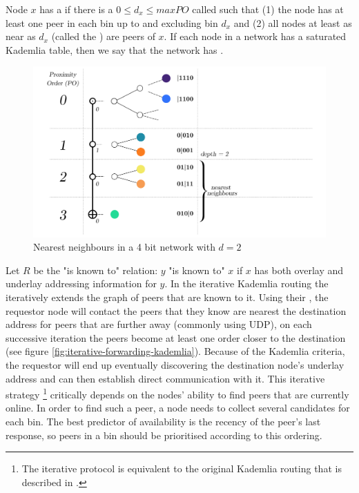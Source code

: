 \begin{figure}[htbp]
   \label{fig:kademlia-table}
\end{figure}

Node $x$ has a  if there is a $0\leq d_x\leq \mathit{maxPO}$ called  such that (1) the node has at least one peer in each bin up to and excluding  bin $d_x$ and (2) all nodes at least as near as $d_x$ (called the ) are peers of $x$. If each node in a network has a saturated Kademlia table, then we say that the network has .

\begin{figure}[htbp]
   \centering
    \includegraphics[width=\textwidth]{fig/kademlia-3.pdf}
   \caption[Nearest neighbours \statusgreen]{Nearest neighbours in a 4 bit network with $d = 2$ }
   \label{fig:bin-density}
\end{figure}

Let $R$ be the "is known to" relation:  $y$ "is known to" $x$ if $x$ has both overlay and underlay addressing information for $y$. 
In the iterative Kademlia routing the  iteratively extends the graph of peers that are known to it. Using their , the requestor node will contact the peers that they know are nearest the destination address for peers that are further away (commonly using UDP), on each successive iteration the peers become at least one order closer to the destination (see figure \ref{fig:iterative-forwarding-kademlia}). Because of the Kademlia criteria, the requestor will end up eventually discovering the destination node's underlay address and can then establish direct communication with it. This iterative strategy%
%
\footnote{The iterative protocol is equivalent to the original Kademlia routing that is described in \cite{maymounkov2002kademlia}.
}
%
critically depends on the nodes' ability to find peers that are currently online. In order to find such a peer, a node needs to collect several candidates for each bin. The best predictor of availability is the recency of the peer's last response, so peers in a bin should be prioritised according to this ordering.

